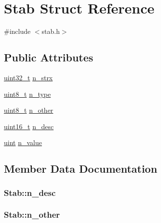 \hypertarget{structStab}{}\section{Stab Struct Reference}
\label{structStab}


{\ttfamily \#include $<$stab.\+h$>$}

\subsection*{Public Attributes}
\begin{DoxyCompactItemize}
\item 
\hyperlink{types_8h_a435d1572bf3f880d55459d9805097f62}{uint32\+\_\+t} \hyperlink{structStab_a8d874c575cc5137432a0b5fd0b202119}{n\+\_\+strx}
\item 
\hyperlink{types_8h_aba7bc1797add20fe3efdf37ced1182c5}{uint8\+\_\+t} \hyperlink{structStab_a4952b6befb5edaaa136fd49b7a52ddc8}{n\+\_\+type}
\item 
\hyperlink{types_8h_aba7bc1797add20fe3efdf37ced1182c5}{uint8\+\_\+t} \hyperlink{structStab_a70852cf6c049c690f0b7a93aab5fffbf}{n\+\_\+other}
\item 
\hyperlink{types_8h_a273cf69d639a59973b6019625df33e30}{uint16\+\_\+t} \hyperlink{structStab_a19fc71754b1c75e5dcd59f1522301f2d}{n\+\_\+desc}
\item 
\hyperlink{custom__types_8h_a91ad9478d81a7aaf2593e8d9c3d06a14}{uint} \hyperlink{structStab_a934b1b9ccdfb7c332b0513f9d460bed5}{n\+\_\+value}
\end{DoxyCompactItemize}


\subsection{Member Data Documentation}
\subsubsection[{\texorpdfstring{n\+\_\+desc}{n_desc}}]{ Stab\+::n\+\_\+desc}\hypertarget{structStab_a19fc71754b1c75e5dcd59f1522301f2d}{}\label{structStab_a19fc71754b1c75e5dcd59f1522301f2d}
\subsubsection[{\texorpdfstring{n\+\_\+other}{n_other}}]{ Stab\+::n\+\_\+other}\hypertarget{structStab_a70852cf6c049c690f0b7a93aab5fffbf}{}\label{structStab_a70852cf6c049c690f0b7a93aab5fffbf}
